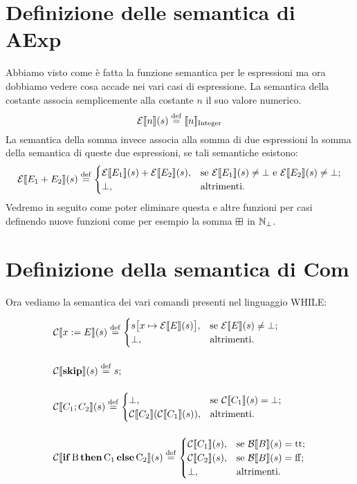 \section{Definizione delle semantica di AExp} 
Abbiamo visto come è fatta la funzione semantica per le espressioni ma ora dobbiamo vedere cosa accade nei vari casi di espressione. La semantica della costante associa semplicemente alla costante $n$ il suo valore numerico.
$$ \denotE{n}{s} \defeq \llbracket n \rrbracket_{\Integer}$$
La semantica della somma invece associa alla somma di due espressioni la somma della semantica di queste due espressioni, se tali semantiche esistono:
$$ \denotE{E_1 + E_2}{s} \defeq \begin{cases}
        \denotE{E_1}{s} + \denotE{E_2}{s}, &\text{se $\denotE{E_1}{s} \neq \bot$ e $\denotE{E_2}{s} \neq \bot$;}\\
      	\bot, &\text{altrimenti.}\\
        \end{cases}
$$
Vedremo in seguito come poter eliminare questa e altre funzioni per casi definendo nuove funzioni come per esempio la somma $\mathbin{\boxplus}$ in $\mathbb{N}_\bot$.

\section{Definizione della semantica di Com} 
Ora vediamo la semantica dei vari comandi presenti nel linguaggio WHILE:

\begin{align*}
&\denotC{x \weq E}{s} \defeq \begin{cases}
        \bigassign{s}{x}{\denotE{E}{s}}, &\text{se $\denotE{E}{s} \neq \bot$;}\\
        \bot, &\text{altrimenti.}
        \end{cases}
\pts
&\denotC{\kw{skip}}{s} \defeq s;
\pts
&\denotC{C_1 ; C_2}{s} \defeq \begin{cases}
        \bot, &\text{se $\denotC{C_1}{s} = \bot$;}\\
        \denotC{C_2}{\denotC{C_1}{s}}, &\text{altrimenti.}\\
        \end{cases}
\pts
&\denotC{\condif{B}{C_1}{C_2}}{s} \defeq \begin{cases}
        \denotC{C_1}{s}, &\text{se $\denotB{B}{s} = \ttv$;}\\
        \denotC{C_2}{s}, &\text{se $\denotB{B}{s} = \ffv$;}\\
        \bot, &\text{altrimenti.}
        \end{cases}
\pts
\end{align*}

